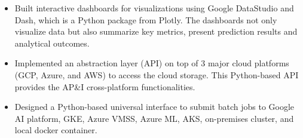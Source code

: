 \documentclass[11pt,a4paper,roman]{moderncv}
\begin{document}
{{\begin{itemize}
\item Built interactive dashboards for visualizations using Google DataStudio and Dash, which is a Python package from Plotly. The dashboards not only visualize data but also summarize key metrics, present prediction results and analytical outcomes. 
\item Implemented an abstraction layer (API) on top of 3 major cloud platforms (GCP, Azure, and AWS) to access the cloud storage. This Python-based API provides the AP\&I cross-platform functionalities.
\item Designed a Python-based universal interface to submit batch jobs to Google AI platform, GKE, Azure VMSS, Azure ML, AKS, on-premises cluster, and local docker container.

\end{itemize}}}
\end{document}
